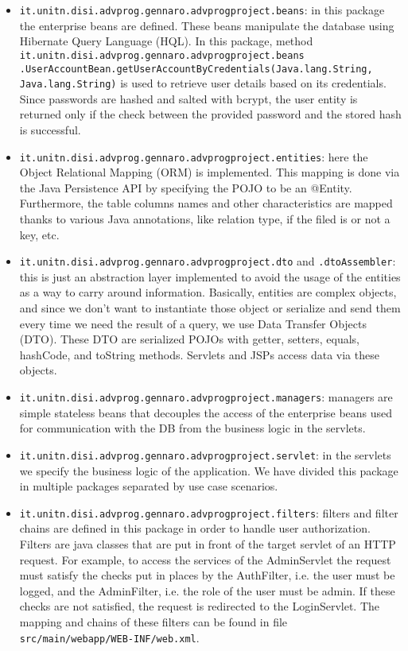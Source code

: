 \begin{itemize}
    \item \texttt{it.unitn.disi.advprog.gennaro.adv\textunderscore prog\textunderscore project.beans}: in this package the enterprise beans are defined. These beans manipulate the database using Hibernate Query Language (HQL). In this package, method \texttt{it.unitn.disi.advprog.gennaro.adv\textunderscore prog\textunderscore project.beans}\\\texttt{.UserAccountBean.getUserAccountByCredentials(Java.lang.String, Java.lang.String)} is used to retrieve user details based on its credentials. Since passwords are hashed and salted with bcrypt, the user entity is returned only if the check between the provided password and the stored hash is successful.
    \item \texttt{it.unitn.disi.advprog.gennaro.adv\textunderscore prog\textunderscore project.entities}: here the Object Relational Mapping (ORM) is implemented. This mapping is done via the Java Persistence API by specifying the POJO to be an @Entity. Furthermore, the table columns names and other characteristics are mapped thanks to various Java annotations, like relation type, if the filed is or not a key, etc.
    \item \texttt{it.unitn.disi.advprog.gennaro.adv\textunderscore prog\textunderscore project.dto} and \texttt{.dtoAssembler}: this is just an abstraction layer implemented to avoid the usage of the entities as a way to carry around information. Basically, entities are complex objects, and since we don't want to instantiate those object or serialize and send them every time we need the result of a query, we use Data Transfer Objects (DTO). These DTO are serialized POJOs with getter, setters, equals, hashCode, and toString methods. Servlets and JSPs access data via these objects.
    \item \texttt{it.unitn.disi.advprog.gennaro.adv\textunderscore prog\textunderscore project.managers}: managers are simple stateless beans that decouples the access of the enterprise beans used for communication with the DB from the business logic in the servlets.
    \item \texttt{it.unitn.disi.advprog.gennaro.adv\textunderscore prog\textunderscore project.servlet}: in the servlets we specify the business logic of the application. We have divided this package in multiple packages separated by use case scenarios.
    \item \texttt{it.unitn.disi.advprog.gennaro.adv\textunderscore prog\textunderscore project.filters}: filters and filter chains are defined in this package in order to handle user authorization. Filters are java classes that are put in front of the target servlet of an HTTP request. For example, to access the services of the AdminServlet the request must satisfy the checks put in places by the AuthFilter, i.e. the user must be logged, and the AdminFilter, i.e. the role of the user must be admin. If these checks are not satisfied, the request is redirected to the LoginServlet. The mapping and chains of these filters can be found in file \texttt{src/main/webapp/WEB-INF/web.xml}.

\end{itemize}
